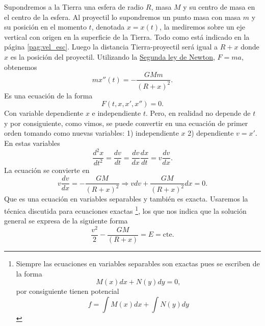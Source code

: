 \documentclass{article}
\begin{document}
 
Supondremos a la Tierra una esfera de radio $R$, masa $M$ y su centro de masa en el centro de la esfera.   Al proyectil lo supondremos un punto masa 
con masa $m$ y su posición en el momento $t$, denotada $x=x(t)$, la mediremos sobre un eje vertical con origen en la superficie de la Tierra.  Todo como está indicado en la página \ref{pag:vel_esc}. 
Luego la distancia Tierra-proyectil será igual a $R+x$ donde $x$ es la posición del proyectil. Utilizando la \href{http://es.wikipedia.org/wiki/Leyes_de_Newton\#Segunda_ley_de_Newton_o_ley_de_fuerza}{Segunda ley de Newton}, $F=ma$, obtenemos
\[mx''(t)=-\frac{GMm}{(R+x)^2}.\]
Es una ecuación de la forma
\[F(t,x,x',x'')=0.\]
Con variable dependiente $x$ e independiente $t$. Pero, en realidad no depende de $t$ y por consiguiente, como vimos, se puede convertir en una ecuación de primer orden
tomando como nuevas variables: 1) independiente $x$ 2) dependiente $v=x'$. En estas variables
\[\frac{d^2x}{dt^2}=\frac{dv}{dt}=\frac{dv}{dx}\frac{dx}{dt}=v\frac{dv}{dx}.\]
La ecuación se convierte en
\[v\frac{dv}{dx}=-\frac{GM}{(R+x)^2}\Longrightarrow vdv+\frac{GM}{(R+x)^2}dx=0.\]
Que es una ecuación en variables separables y también es exacta. Usaremos la técnica discutida para 
ecuaciones exactas \footnote{Siempre las ecuaciones en variables separables son exactas pues se escriben de la forma
\[M(x)dx+N(y)dy=0,\]
por consiguiente tienen potencial
\[f=\int M(x)dx +\int N(y)dy\]}, los que nos indica que la solución general se expresa de la siguiente forma
\begin{equation}\label{energia}
 \frac{v^2}{2}-\frac{GM}{(R+x)}=E=\text{cte}.
\end{equation}
\end{document}
